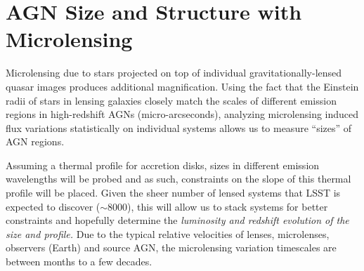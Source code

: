 %
%
%
%
%
%
%

\section{AGN Size and Structure with Microlensing}
\def\secname{\chpname:microlensing}\label{sec:microlensing}




Microlensing due to stars projected on top of individual
gravitationally-lensed quasar images produces additional magnification.
Using the fact that the Einstein radii of stars in lensing galaxies
closely match the scales of different emission regions in
high-redshift AGNs (micro-arcseconds), analyzing microlensing induced
flux variations statistically on individual systems allows us to
measure ``sizes'' of AGN regions.

Assuming a thermal profile for accretion disks, sizes in different
emission wavelengths will be probed and as such, constraints on the
slope of this thermal profile will be placed. Given the sheer number
of lensed systems that LSST is expected to discover ($\sim8000$),
this will allow us to stack systems for better constraints and
hopefully determine the {\it luminosity and redshift evolution of the size and profile.} Due to the
typical relative velocities of lenses, microlenses, observers (Earth)
and source AGN, the microlensing variation timescales are between
months to a few decades.


